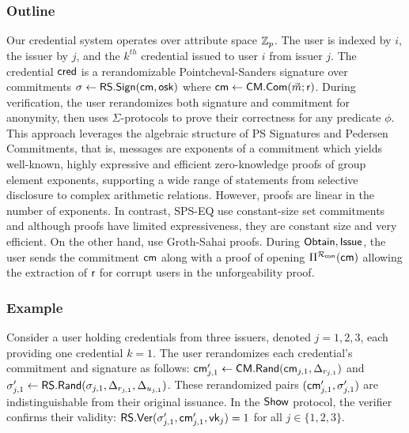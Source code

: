 \subsubsection{Outline}
Our credential system operates over attribute space $\mathbb{Z}_p$. The user is indexed by $i$, the issuer by $j$, and the $k^{th}$ credential issued to user $i$ from issuer $j$. The credential $\mathsf{cred}$ is a rerandomizable Pointcheval-Sanders signature over commitments $\sigma \gets \mathsf{RS.Sign}(\mathsf{cm}, \mathsf{osk})$ where $\mathsf{cm} \gets \mathsf{CM.Com}(\vec{m}; \mathsf{r})$. During verification, the user rerandomizes both signature and commitment for anonymity, then uses $\Sigma$-protocols to prove their correctness for any predicate $\phi$. This approach leverages the algebraic structure of PS Signatures and Pedersen Commitments, that is, messages are exponents of a commitment which yields well-known, highly expressive and efficient zero-knowledge proofs of group element exponents, supporting a wide range of statements from selective disclosure to complex arithmetic relations. However, proofs are linear in the number of exponents. In contrast, SPS-EQ \cite{fuchsbauer_structure-preserving_2019, hanaoka_improved_2022} use constant-size set commitments and although proofs have limited expressiveness, they are constant size and very efficient. On the other hand, \cite{rabaninejad_attribute-based_2024} use Groth-Sahai proofs. During $\mathsf{Obtain}, \mathsf{Issue}$, the user sends the commitment $\mathsf{cm}$ along with a proof of opening $\Pi^{\mathcal{R}_{\mathsf{com}}}(\mathsf{cm})$ allowing the extraction of $\mathsf{r}$ for corrupt users in the unforgeability proof.

\subsubsection{Example}
Consider a user holding credentials from three issuers, denoted $j = 1, 2, 3$, each providing one credential $k = 1$. The user rerandomizes each credential’s commitment and signature as follows: $\mathsf{cm}_{j,1}' \gets \mathsf{CM.Rand}(\mathsf{cm}_{j,1}, \Delta_{r_{j,1}})$ and $\sigma_{j,1}' \gets \mathsf{RS.Rand}(\sigma_{j,1}, \Delta_{r_{j,1}}, \Delta_{u_{j,1}})$. These rerandomized pairs $(\mathsf{cm}_{j,1}', \sigma_{j,1}')$ are indistinguishable from their original issuance. In the $\mathsf{Show}$ protocol, the verifier confirms their validity: $\mathsf{RS.Ver}(\sigma_{j,1}', \mathsf{cm}_{j,1}', \mathsf{vk}_j) = 1$ for all $j \in \{1, 2, 3\}$.

